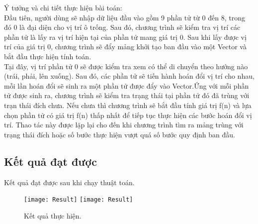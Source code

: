 Ý tưởng và chi tiết thực hiện bài toán:\\
Đầu tiên, người dùng sẽ nhập dữ liệu đầu vào gồm 9 phần tử từ 0 đến 8, trong đó 0 là đại diện cho vị trí ô trống. Sau đó, chương trình sẽ kiểm tra vị trí các phần tử là lấy ra vị trí hiện tại của phần tử mang giá trị 0. Sau khi lấy được vị trí của giá trị 0, chương trình sẽ đẩy mảng khởi tạo ban đầu vào một Vector và bắt đầu thực hiện tính toán.\\
Tại đây, vị trí phần tử 0 sẽ được kiểm tra xem có thể di chuyển theo hướng nào (trái, phải, lên xuống). Sau đó, các phần tử sẽ tiến hành hoán đổi vị trí cho nhau, mỗi lần hoán đổi sẽ sinh ra một phần tử được đẩy vào Vector.Ứng với mỗi phần tử được sinh ra, chương trình sẽ kiểm tra trạng thái tại phần tử đó đã trùng với trạn thái đích chưa. Nếu chưa thì chương trình sẽ bắt đầu tính giá trị f(n) và lựa chọn phần tử có giá trị f(n) thấp nhất để tiếp tục thực hiện các bước hoán đổi vị trí. Thao tác này được lặp lại cho đến khi chương trình tìm ra mảng trùng với trạng thái đích hoặc số bước thực hiện vượt quá số bước quy định ban đầu.\\
\subsection{Kết quả đạt được}
Kết quả đạt được sau khi chạy thuật toán.\\
\begin{figure}[!htbp]
  \begin{center}
    \leavevmode
    \ifpdf
      \texttt{[image: Result]}
    \else
      \texttt{[image: Result]}
    \fi
    \caption{Kết quả thực hiện.}
    \label{FigAir}
   
  \end{center}
\end{figure}
\FloatBarrier

